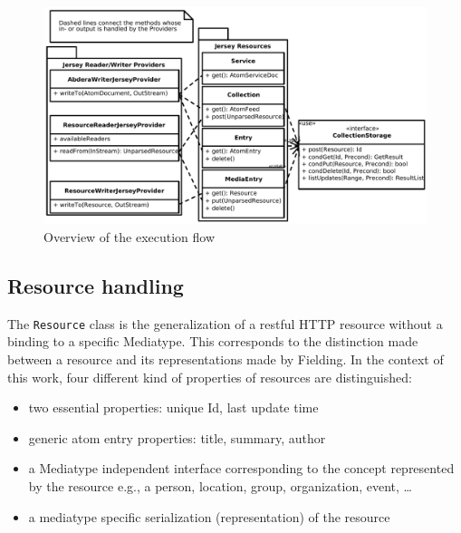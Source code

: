 \documentclass[12pt,a4paper,twoside]{scrartcl}		%
\begin{document}
\begin{figure}[htb]
  \centering
  \includegraphics[width=1.2\textwidth]{executionflowoverview}

  \caption{Overview of the execution flow}
  \label{fig:executionflowoverview}
\end{figure}

\subsection{Resource handling}
\label{sec:resource-handling}



The \lstinline:Resource: class is the generalization of a restful HTTP resource
without a binding to a specific Mediatype. This corresponds to the distinction
made between a resource and its representations made by
Fielding\cite[sec. 5.2.1.1]{Fielding2000}. In the context of this work, four
different kind of properties of resources are distinguished:

\begin{itemize}
\item two essential properties: unique Id, last update time
\item generic atom entry properties: title, summary, author
\item a Mediatype independent interface corresponding to the concept represented
  by the resource e.g., a person, location, group, organization, event, \ldots
\item a mediatype specific serialization (representation) of the resource
\end{itemize}
\end{document}
